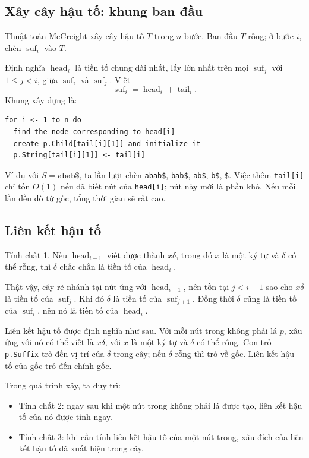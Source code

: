 \documentclass[11pt]{article}
\begin{document}
\subsection{Xây cây hậu tố: khung ban đầu}

Thuật toán McCreight xây cây hậu tố $T$ trong $n$ bước. Ban đầu $T$ rỗng; ở
bước $i$, chèn $\operatorname{suf}_i$ vào $T$.

Định nghĩa $\operatorname{head}_i$ là tiền tố chung dài nhất, lấy lớn nhất
trên mọi $\operatorname{suf}_j$ với $1\le j<i$, giữa $\operatorname{suf}_i$
và $\operatorname{suf}_j$. Viết
\[
  \operatorname{suf}_i=\operatorname{head}_i+\operatorname{tail}_i.
\]
Khung xây dựng là:

\begin{verbatim}
for i <- 1 to n do
  find the node corresponding to head[i]
  create p.Child[tail[i][1]] and initialize it
  p.String[tail[i][1]] <- tail[i]
\end{verbatim}

Ví dụ với $S=\texttt{abab\$}$, ta lần lượt chèn
\texttt{abab\$}, \texttt{bab\$}, \texttt{ab\$}, \texttt{b\$}, \texttt{\$}.
Việc thêm \texttt{tail[i]} chỉ tốn $O(1)$ nếu đã biết nút của
\texttt{head[i]}; nút này mới là phần khó. Nếu mỗi lần đều dò từ gốc, tổng
thời gian sẽ rất cao.

\subsection{Liên kết hậu tố}

Tính chất 1. Nếu $\operatorname{head}_{i-1}$ viết được thành $x\delta$, trong
đó $x$ là một ký tự và $\delta$ có thể rỗng, thì $\delta$ chắc chắn là tiền tố
của $\operatorname{head}_i$.

Thật vậy, cây rẽ nhánh tại nút ứng với $\operatorname{head}_{i-1}$, nên tồn
tại $j<i-1$ sao cho $x\delta$ là tiền tố của $\operatorname{suf}_j$. Khi đó
$\delta$ là tiền tố của $\operatorname{suf}_{j+1}$. Đồng thời $\delta$ cũng là
tiền tố của $\operatorname{suf}_i$, nên nó là tiền tố của
$\operatorname{head}_i$.

Liên kết hậu tố được định nghĩa như sau. Với mỗi nút trong không phải lá $p$,
xâu ứng với nó có thể viết là $x\delta$, với $x$ là một ký tự và $\delta$ có
thể rỗng. Con trỏ \texttt{p.Suffix} trỏ đến vị trí của $\delta$ trong cây; nếu
$\delta$ rỗng thì trỏ về gốc. Liên kết hậu tố của gốc trỏ đến chính gốc.

Trong quá trình xây, ta duy trì:

\begin{itemize}
  \item Tính chất 2: ngay sau khi một nút trong không phải lá được tạo, liên
  kết hậu tố của nó được tính ngay.
  \item Tính chất 3: khi cần tính liên kết hậu tố của một nút trong, xâu đích
  của liên kết hậu tố đã xuất hiện trong cây.
\end{itemize}
\end{document}
